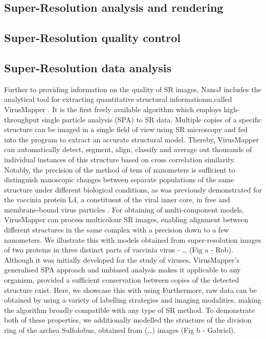 \subsection*{Super-Resolution analysis and rendering}
\Blindtext

\subsection*{Super-Resolution quality control}
\Blindtext

\subsection*{Super-Resolution data analysis}
Further to providing information on the quality of SR images, NanoJ includes the analytical tool for extracting quantitative structural informationm,called VirusMapper  \cite{gray2016virus,gray2017}. It is the first freely available algorithm which employs high-throughput single particle analysis (SPA) to SR data. Multiple copies of a specific structure can be imaged in a single field of view using SR microscopy and fed into the program to extract an accurate structural model. Thereby, VirusMapper can automatically detect, segment, align, classify and average out thousands of individual instances of this structure based on cross correlation similarity. Notably, the precision of the method of tens of nanometers is sufficient to distinguish nanoscopic changes between separate populations of the same structure under different biological conditions, as was previously demonstrated for the vaccinia protein L4, a constituent of the viral inner core, in free and membrane-bound virus particles \cite{gray2016virus}. For obtaining of multi-component models, VirusMapper can process multicolour SR images, enabling alignment between different structures in the same complex with a precision down to a few nanometers. We illustrate this with models obtained from super-resolution images of two proteins in three distinct parts of vaccinia virus - … (Fig a - Rob). 
\newline
Although it was initially developed for the study of viruses, VirusMapper’s generalised SPA approach and unbiased analysis makes it applicable to any organism, provided a sufficient conservation between copies of the detected structure exist. Here, we showcase this with using Furthermore, raw data can be obtained by using a variety of labelling strategies and imaging modalities, making the algorithm broadly compatible with any type of SR method. To demonstrate both of these properties, we additionally modelled the structure of the division ring of the archea Sulfolobus, obtained from (…) images (Fig b - Gabriel). 

